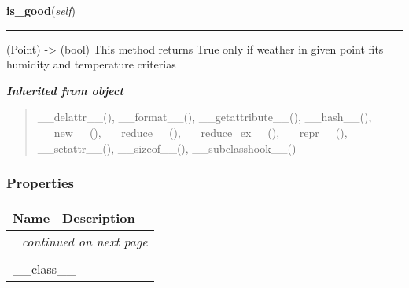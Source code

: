     \label{point:Point:is_good}

    \vspace{0.5ex}

\hspace{.8\funcindent}\begin{boxedminipage}{\funcwidth}

    \raggedright \textbf{is\_good}(\textit{self})

    \vspace{-1.5ex}

    \rule{\textwidth}{0.5\fboxrule}
\setlength{\parskip}{2ex}
    (Point) -{\textgreater} (bool) This method returns True only if weather
    in given point fits humidity and temperature criterias

\setlength{\parskip}{1ex}
    \end{boxedminipage}


\large{\textbf{\textit{Inherited from object}}}

\begin{quote}
\_\_delattr\_\_(), \_\_format\_\_(), \_\_getattribute\_\_(), \_\_hash\_\_(), \_\_new\_\_(), \_\_reduce\_\_(), \_\_reduce\_ex\_\_(), \_\_repr\_\_(), \_\_setattr\_\_(), \_\_sizeof\_\_(), \_\_subclasshook\_\_()
\end{quote}


  \subsubsection{Properties}

    \vspace{-1cm}
\hspace{\varindent}\begin{longtable}{|p{\varnamewidth}|p{\vardescrwidth}|l}
\cline{1-2}
\cline{1-2} \centering \textbf{Name} & \centering \textbf{Description}& \\
\cline{1-2}
\endhead\cline{1-2}\multicolumn{3}{r}{\small\textit{continued on next page}}\\\endfoot\cline{1-2}
\endlastfoot\multicolumn{2}{|l|}{\textit{Inherited from object}}\\
\multicolumn{2}{|p{\varwidth}|}{\raggedright \_\_class\_\_}\\
\cline{1-2}
\end{longtable}

